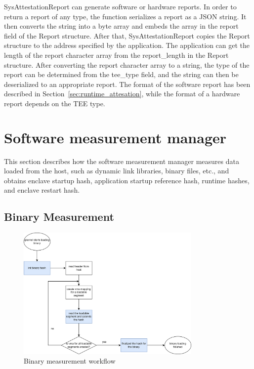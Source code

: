 SysAttestationReport can generate software or hardware reports. In order to return a report of any type, the function serializes a report as a JSON string. It then converts the string into a byte array and embeds the array in the report field of the Report structure. After that, SysAttestationReport copies 
the Report structure to the address specified by the application. The application can get the length of the report character array from the report\_length in the Report structure. After converting the report character array to a string, the type of the report can be determined from the tee\_type field, 
and the string can then be deserialized to an appropriate report. The format of the software report has been described in Section~\ref{sec:runtime_attesation}, while the format of a hardware report depends on the \acrshort{TEE} type.

\section{Software measurement manager}
\label{sec:impl_measurement}

This section describes how the software measurement manager measures data loaded from the host, such as dynamic link libraries, binary files, etc., and obtains enclave startup hash, application startup reference hash, runtime hashes, and enclave restart hash.

\subsection{Binary Measurement}

\begin{figure}[!htb]
    \centering
    \includegraphics[width=0.8\textwidth]{images/measure_binary.png}
    \caption[Binary measurement workflow]{Binary measurement workflow}
    \label{fig:binary_measurement}
\end{figure}

